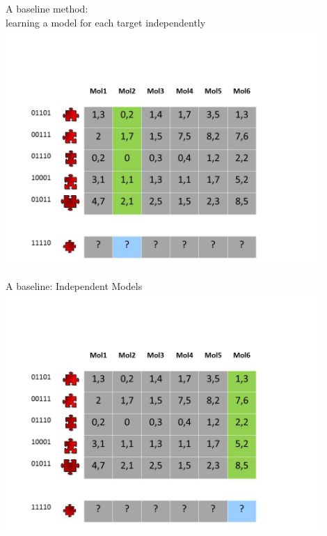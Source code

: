 \documentclass[]{beamer}
\begin{document}
\begin{frame}{A baseline method:\\
learning a model for each target independently}
\includegraphics[width=0.9\textwidth,trim = 0 0 100 100,clip]{Figures/pictures/Slide14}
\end{frame}

\begin{frame}{A baseline: Independent Models}
\includegraphics[width=0.9\textwidth,trim = 0 0 100 100,clip]{Figures/pictures/Slide15}
\end{frame}
\end{document}
